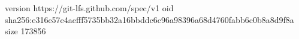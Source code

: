 version https://git-lfs.github.com/spec/v1
oid sha256:e316e57e4aefff5735bb32a16bbddc6c96a98396a68d4760fabb6c0b8a8d9f8a
size 173856
